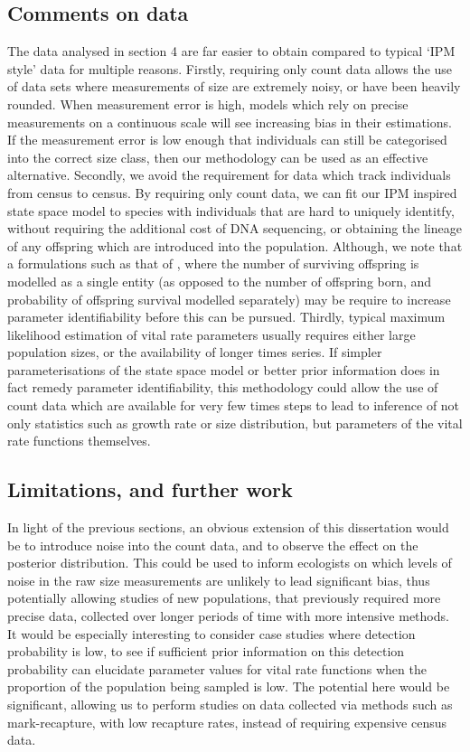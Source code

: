 \documentclass[a4paper,12pt]{article}
\begin{document}
\subsection{Comments on data}
The data analysed in section 4 are far easier to obtain compared to typical `IPM style' data for multiple reasons. Firstly, requiring only count data allows the use of data sets where measurements of size are extremely noisy, or have been heavily rounded. When measurement error is high, models which rely on precise measurements on a continuous scale will see increasing bias in their estimations. If the measurement error is low enough that individuals can still be categorised into the correct size class, then our methodology can be used as an effective alternative. Secondly, we avoid the requirement for data which track individuals from census to census. By requiring only count data, we can fit our IPM inspired state space model to species with individuals that are hard to uniquely identitfy, without requiring the additional cost of DNA sequencing, or obtaining the lineage of any offspring which are introduced into the population. Although, we note that a formulations such as that of \citet{Coulson2012}, where the number of surviving offspring is modelled as a single entity (as opposed to the number of offspring born, and probability of offspring survival modelled separately) may be require to increase parameter identifiability before this can be pursued. Thirdly, typical maximum likelihood estimation of vital rate parameters usually requires either large population sizes, or the availability of longer times series. If simpler parameterisations of the state space model or better prior information does in fact remedy parameter identifiability, this methodology could allow the use of count data which are available for very few times steps to lead to inference of not only statistics such as growth rate or size distribution, but parameters of the vital rate functions themselves.

\subsection{Limitations, and further work}

In light of the previous sections, an obvious extension of this dissertation would be to introduce noise into the count data, and to observe the effect on the posterior distribution. This could be used to inform ecologists on which levels of noise in the raw size measurements are unlikely to lead significant bias, thus potentially allowing studies of new populations, that previously required more precise data, collected over longer periods of time with more intensive methods. It would be especially interesting to consider case studies where detection probability is low, to see if sufficient prior information on this detection probability can  elucidate parameter values for vital rate functions when the proportion of the population being sampled is low. The potential here would be significant, allowing us to perform studies on data collected via methods such as mark-recapture, with low recapture rates, instead of requiring expensive census data.
\end{document}
